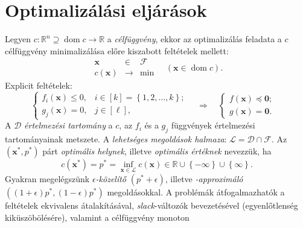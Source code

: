 \documentclass[%
	DIV=15,appendixprefix]{scrreprt}
\theoremstyle{definition}
\theoremstyle{remark}
\DeclareMathOperator{\dom}{dom}
\begin{document}
\section{Optimalizálási eljárások}
%
Legyen $ c \colon \mathbb{ R }^{ n } \supseteq \dom c \rightarrow \mathbb{ R } $ a
\emph{célfüggvény}, ekkor az optimalizálás feladata a $ c $ célfüggvény minimalizálása előre
kiszabott feltételek mellett:
\begin{equation*}
	\begin{array}{rcl}
		\mathbf{ x }					&	\in			&	\mathcal{ F }\\
		\hline
		c \left( \mathbf{ x } \right)	&	\rightarrow	&	\min
	\end{array} \quad \left( \mathbf{ x } \in \dom c \right).
\end{equation*}
Explicit feltételek:
\begin{equation*}
	\begin{cases}
		f_{ i } \left( \mathbf{ x } \right) \le 0,	&	i \in \left[ k \right] = \left\{ 1,{} 2,{}
			\ldots,{} k \right\};\\
		g_{ j } \left( \mathbf{ x } \right) = 0,	&	j \in \left[ \ell \right],
	\end{cases} \quad \Rightarrow \quad \begin{cases}
		f \left( \mathbf{ x } \right) \preceq \mathbf{ 0 };	&\\
		g \left( \mathbf{ x } \right) = \mathbf{ 0 }.		&
	\end{cases}
\end{equation*}
A $ \mathcal{ D } $ \emph{értelmezési tartomány} a $ c $, az $ f_{ i } $ és a $ g_{ j } $ függvények
értelmezési tartományainak metszete. A \emph{lehetséges megoldások halmaza}: $ \mathcal{ L } =
\mathcal{ D } \cap \mathcal{ F } $. Az $ \left( \mathbf{ x }^{ * },{} p^{ * } \right) $ párt
\emph{optimális helynek}, illetve \emph{optimális értéknek} nevezzük, ha
\begin{equation*}
	c \left( \mathbf{ x }^{ * } \right) = p^{ * } = \inf_{ \mathbf{ x } \in \mathcal{ L } } c \left(
	\mathbf{ x } \right) \in \mathbb{ R } \cup \left\{ - \infty \right\} \cup \left\{ \infty
	\right\}.
\end{equation*}
Gyakran megelégszünk \emph{$ \epsilon $-közelítő} $ \left( p^{ * } + \epsilon \right) $, illetve
\emph{-approximáló} $ \left( \left( 1 + \epsilon \right) p^{ * },{} \left( 1 - \epsilon \right)
p^{ * } \right) $ megoldásokkal. A problémák átfogalmazhatók a feltételek ekvivalens átalakításával,
\emph{slack}-változók bevezetésével (egyenlőtlenség kiküszöbölésére), valamint a célfüggvény monoton
\end{document}

